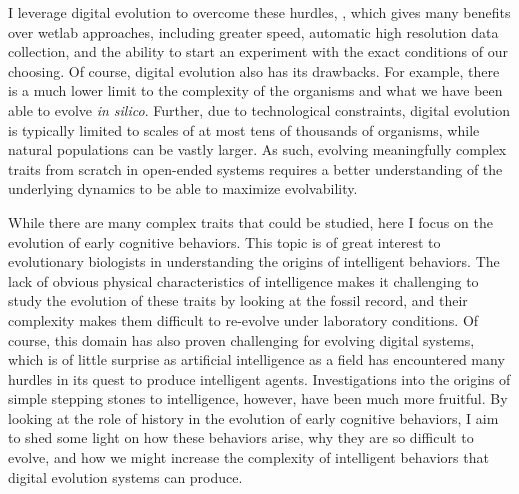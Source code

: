 I leverage digital evolution to overcome these hurdles, , which gives many benefits over wetlab approaches, including greater speed, automatic high resolution data collection, and the ability to start an experiment with the exact conditions of our choosing.
Of course, digital evolution also has its drawbacks. 
For example, there is a much lower limit to the complexity of the organisms and what we have been able to evolve \textit{in silico}.
Further, due to technological constraints, digital evolution is typically limited to scales of at most tens of thousands of organisms, while natural populations can be vastly larger.
As such, evolving meaningfully complex traits from scratch in open-ended systems requires a better understanding of the underlying dynamics to be able to maximize evolvability. 

While there are many complex traits that could be studied, here I focus on the evolution of early cognitive behaviors. 
This topic is of great interest to evolutionary biologists in understanding the origins of intelligent behaviors.
The lack of obvious physical characteristics of intelligence makes it challenging to study the evolution of these traits by looking at the fossil record, and their complexity makes them difficult to re-evolve under laboratory conditions.
Of course, this domain has also proven challenging for evolving digital systems, which is of little surprise as artificial intelligence as a field has encountered many hurdles in its quest to produce intelligent agents. %
Investigations into the origins of simple stepping stones to intelligence, however, have been much more fruitful. 
By looking at the role of history in the evolution of early cognitive behaviors, I aim to shed some light on how these behaviors arise, why they are so difficult to evolve, and how we might increase the complexity of intelligent behaviors that digital evolution systems can produce.